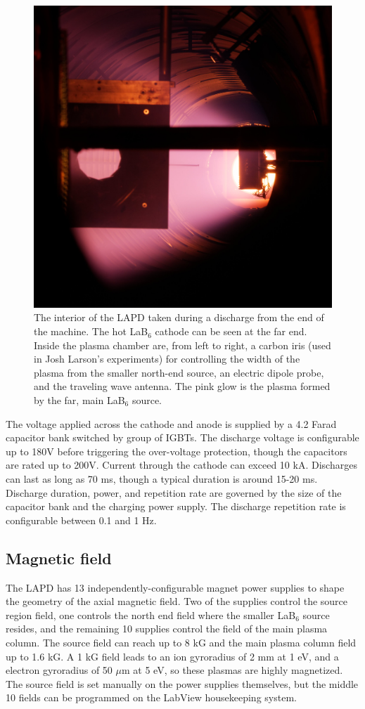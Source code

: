 \begin{figure}
	\centering
	\includegraphics[width=350pt]{figures/lapd_inside.jpg}
	\caption[Picture of LAPD interior]{\label{fig:lapd-inside}The interior of the LAPD taken during a discharge from the end of the machine. The hot LaB$_6$ cathode can be seen at the far end. Inside the plasma chamber are, from left to right, a carbon iris (used in Josh Larson's experiments) for controlling the width of the plasma from the smaller north-end source, an electric dipole probe, and the traveling wave antenna. The pink glow is the plasma formed by the far, main LaB$_6$ source.}
\end{figure}


The voltage applied across the cathode and anode is supplied by a 4.2 Farad capacitor bank switched by group of IGBTs. The discharge voltage is configurable up to 180V before triggering the over-voltage protection, though the capacitors are rated up to 200V. Current through the cathode can exceed 10 kA. Discharges can last as long as 70 ms, though a typical duration is around 15-20 ms. Discharge duration, power, and repetition rate are governed by the size of the capacitor bank and the charging power supply. The discharge repetition rate is configurable between 0.1 and 1 Hz.

\subsection{Magnetic field}
The LAPD has 13 independently-configurable magnet power supplies to shape the geometry of the axial magnetic field. Two of the supplies control the source region field, one controls the north end field where the smaller LaB$_6$ source resides, and the remaining 10 supplies control the field of the main plasma column. The source field can reach up to 8 kG and the main plasma column field up to 1.6 kG. A 1 kG field leads to an ion gyroradius of 2 mm at 1 eV, and a electron gyroradius of 50 $\mu$m at 5 eV, so these plasmas are highly magnetized. The source field is set manually on the power supplies themselves, but the middle 10 fields can be programmed on the LabView housekeeping system.

